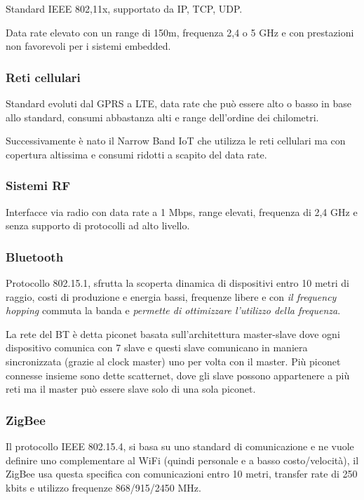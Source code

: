 Standard IEEE 802,11x, supportato da IP, TCP, UDP.

Data rate elevato con un range di 150m, frequenza 2,4 o 5 GHz e con
prestazioni non favorevoli per i sistemi embedded.

\subsubsection{Reti cellulari}\label{reti-cellulari}

Standard evoluti dal GPRS a LTE, data rate che può essere alto o basso
in base allo standard, consumi abbastanza alti e range dell'ordine dei
chilometri.

Successivamente è nato il Narrow Band IoT che utilizza le reti cellulari
ma con copertura altissima e consumi ridotti a scapito del data rate.

\subsubsection{Sistemi RF}\label{sistemi-rf}

Interfacce via radio con data rate a 1 Mbps, range elevati, frequenza di
2,4 GHz e senza supporto di protocolli ad alto livello.

\subsubsection{Bluetooth}\label{bluetooth}

Protocollo 802.15.1, sfrutta la scoperta dinamica di dispositivi entro
10 metri di raggio, costi di produzione e energia bassi, frequenze
libere e con \emph{il frequency hopping} commuta la banda e
\emph{permette di ottimizzare l'utilizzo della frequenza}.

La rete del BT è detta piconet basata sull'architettura master-slave
dove ogni dispositivo comunica con 7 slave e questi slave comunicano in
maniera sincronizzata (grazie al clock master) uno per volta con il
master. Più piconet connesse insieme sono dette scatternet, dove gli
slave possono appartenere a più reti ma il master può essere slave solo
di una sola piconet.

\subsubsection{ZigBee}\label{zigbee}

Il protocollo IEEE 802.15.4, si basa su uno standard di comunicazione e
ne vuole definire uno complementare al WiFi (quindi personale e a basso
costo/velocità), il ZigBee usa questa specifica con comunicazioni entro
10 metri, transfer rate di 250 kbits e utilizzo frequenze 868/915/2450
MHz.

